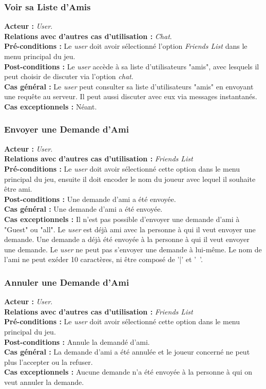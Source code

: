 \documentclass[10pt, a4paper]{article}
\begin{document}
\subsubsection{Voir sa Liste d'Amis}
\textbf{Acteur :} \textit{User}.\\
\textbf{Relations avec d'autres cas d'utilisation :} \textit{Chat}.\\
\textbf{Pré-conditions :} Le \textit{user} doit avoir sélectionné l'option \textit{Friends List} dans le menu principal du jeu.\\
\textbf{Post-conditions :} Le \textit{user} accède à sa liste d'utilisateurs "amis", avec lesquels il peut choisir de discuter via l'option \textit{chat}.\\
\textbf{Cas général :} Le \textit{user} peut consulter sa liste d'utilisateurs "amis" en envoyant une requête au serveur. Il peut aussi discuter avec eux via messages instantanés.\\
\textbf{Cas exceptionnels :} Néant.

\subsubsection{Envoyer une Demande d'Ami}
\textbf{Acteur :} \textit{User}. \\
\textbf{Relations avec d'autres cas d'utilisation :} \textit{Friends List} \\
\textbf{Pré-conditions :}  Le \textit{user} doit avoir sélectionné cette option dans le menu principal du jeu, ensuite il doit encoder le nom du joueur avec lequel il souhaite être ami.\\
\textbf{Post-conditions :} Une demande d'ami a été envoyée.\\
\textbf{Cas général :} Une demande d'ami a été envoyée.\\
\textbf{Cas exceptionnels :} Il n'est pas possible d'envoyer une demande d'ami à "Guest" ou "all". Le \textit{user} est déjà ami avec la personne à qui il veut envoyer une demande. Une demande a déjà été envoyée à la personne à qui il veut envoyer une demande. Le \textit{user} ne peut pas s'envoyer une demande à lui-même. Le nom de l'ami ne peut exéder 10 caractères, ni être composé de '|' et '~'.

\subsubsection{Annuler une Demande d'Ami}
\textbf{Acteur :} \textit{User}. \\
\textbf{Relations avec d'autres cas d'utilisation :} \textit{Friends List} \\
\textbf{Pré-conditions :}  Le \textit{user} doit avoir sélectionné cette option dans le menu principal du jeu.\\
\textbf{Post-conditions :} Annule la demandé d'ami.\\
\textbf{Cas général :} La demande d'ami a été annulée et le joueur concerné ne peut plus l'accepter ou la refuser.\\
\textbf{Cas exceptionnels :} Aucune demande n'a été envoyée à la personne à qui on veut annuler la demande.
\end{document}
